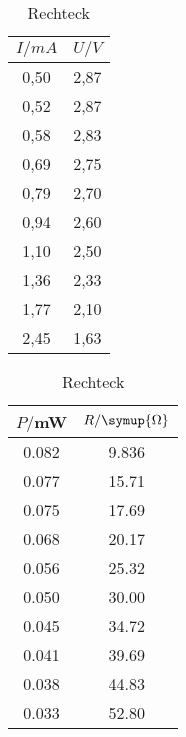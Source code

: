 \begin{table}[H]
  \centering
  \caption{Rechteck}
  \begin{tabular}{c c}
    \toprule
     $I/mA$ & $U/V$  \\
    \midrule
    0,50 & 2,87 \\
    0,52 & 2,87 \\
    0,58 & 2,83 \\
    0,69 & 2,75 \\
    0,79 & 2,70 \\
    0,94 & 2,60 \\
    1,10 & 2,50 \\
    1,36 & 2,33 \\
    1,77 & 2,10 \\
    2,45 & 1,63 \\
  \bottomrule
  \end{tabular}
\end{table}


\begin{table}[H]
  \centering
  \caption{Rechteck}
  \begin{tabular}{c c}
    \toprule
    $P/$mW & $R/ \symup{\Omega}$  \\
    \midrule
    0.082 & 9.836 \\
    0.077 & 15.71 \\
    0.075 & 17.69 \\
    0.068 & 20.17 \\
    0.056 & 25.32 \\
    0.050 & 30.00 \\
    0.045 & 34.72 \\
    0.041 & 39.69 \\
    0.038 & 44.83 \\
    0.033 & 52.80 \\
   
  \bottomrule
  \end{tabular}
\end{table}